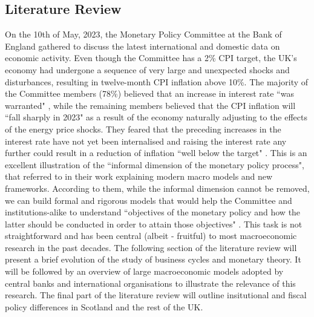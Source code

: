 \subsection{Literature Review}

On the 10th of May, 2023, the Monetary Policy Committee at the Bank of England gathered to discuss the latest international and domestic data on economic activity. Even though the Committee has a 2\% CPI target, the UK's economy had undergone a sequence of very large and unexpected shocks and disturbances, resulting in twelve-month CPI inflation above 10\%. The majority of the Committee members (78\%) believed that an increase in interest rate ``was warranted" \parencite[4]{boe_2023_monetary}, while the remaining members believed that the CPI inflation will ``fall sharply in 2023" \parencite[5]{boe_2023_monetary} as a result of the economy naturally adjusting to the effects of the energy price shocks. They feared that the preceding increases in the interest rate have not yet been internalised and raising the interest rate any further could result in a reduction of inflation ``well below the target" \parencite[5]{boe_2023_monetary}. This is an excellent illustration of the ``informal dimension of the monetary policy process", that \parencite[26]{gals_2007_macroeconomic} referred to in their work explaining modern macro models and new frameworks. According to them, while the informal dimension cannot be removed, we can build formal and rigorous models that would help the Committee and institutions-alike to understand ``objectives of the monetary policy and how the latter should be conducted in order to attain those objectives" \parencite[2]{jordigal_2015_monetary}. This task is not straightforward and has been central (albeit - fruitful) to most macroeconomic research in the past decades. The following section of the literature review will present a brief evolution of the study of business cycles and monetary theory. It will be followed by an overview of large macroeconomic models adopted by central banks and international organisations to illustrate the relevance of this research. The final part of the literature review will outline insitutional and fiscal policy differences in Scotland and the rest of the UK.

